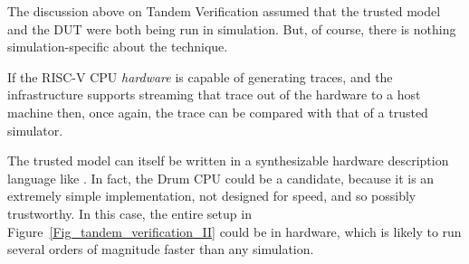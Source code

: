The discussion above on Tandem Verification assumed that the trusted
model and the DUT were both being run in simulation.  But, of course,
there is nothing simulation-specific about the technique.

If the RISC-V CPU \emph{hardware} is capable of generating traces, and
the infrastructure supports streaming that trace out of the hardware
to a host machine then, once again, the trace can be compared with
that of a trusted simulator.

The trusted model can itself be written in a synthesizable hardware
description language like {\BSV}.  In fact, the Drum CPU could be a
candidate, because it is an extremely simple implementation, not
designed for speed, and so possibly trustworthy.  In this case, the
entire setup in Figure~\ref{Fig_tandem_verification_II} could be in
hardware, which is likely to run several orders of magnitude faster
than any simulation.

